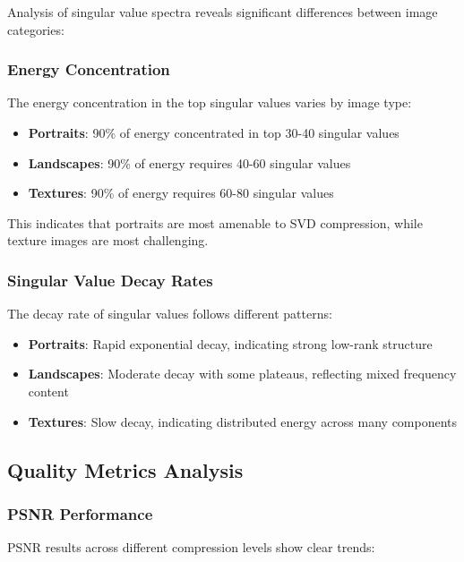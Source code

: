\documentclass[12pt,a4paper]{article}
\begin{document}
Analysis of singular value spectra reveals significant differences between image categories:

\subsubsection{Energy Concentration}

The energy concentration in the top singular values varies by image type:

\begin{itemize}
    \item \textbf{Portraits}: 90\% of energy concentrated in top 30-40 singular values
    \item \textbf{Landscapes}: 90\% of energy requires 40-60 singular values  
    \item \textbf{Textures}: 90\% of energy requires 60-80 singular values
\end{itemize}

This indicates that portraits are most amenable to SVD compression, while texture images are most challenging.

\subsubsection{Singular Value Decay Rates}

The decay rate of singular values follows different patterns:

\begin{itemize}
    \item \textbf{Portraits}: Rapid exponential decay, indicating strong low-rank structure
    \item \textbf{Landscapes}: Moderate decay with some plateaus, reflecting mixed frequency content
    \item \textbf{Textures}: Slow decay, indicating distributed energy across many components
\end{itemize}

\subsection{Quality Metrics Analysis}

\subsubsection{PSNR Performance}

PSNR results across different compression levels show clear trends:
\end{document}

